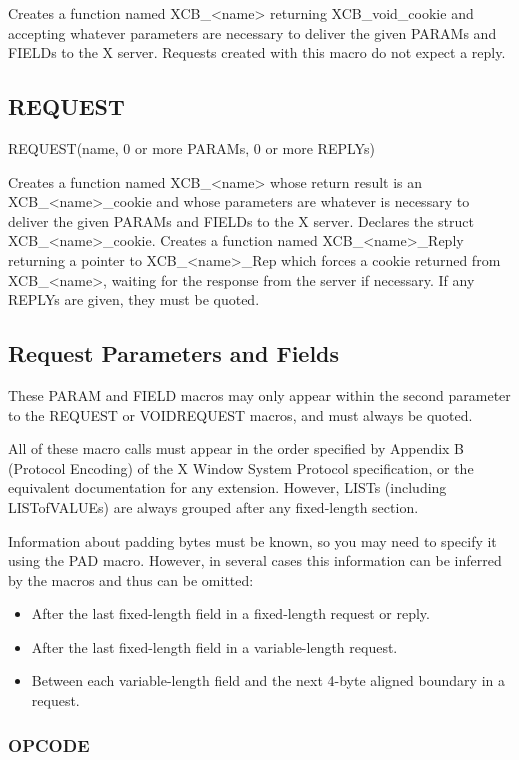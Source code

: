 \documentclass{article}
\begin{document}
Creates a function named XCB\_<name> returning XCB\_void\_cookie and
accepting whatever parameters are necessary to deliver the given PARAMs
and FIELDs to the X server. Requests created with this macro do not
expect a reply.


\subsection{REQUEST}

REQUEST(name, 0 or more PARAMs, 0 or more REPLYs)

Creates a function named XCB\_<name> whose return result is
an XCB\_<name>\_cookie and whose parameters are whatever is
necessary to deliver the given PARAMs and FIELDs to the X
server. Declares the struct XCB\_<name>\_cookie.  Creates a
function named XCB\_<name>\_Reply returning a pointer to
XCB\_<name>\_Rep which forces a cookie returned from
XCB\_<name>, waiting for the response from the server if
necessary. If any REPLYs are given, they must be quoted.


\subsection{Request Parameters and Fields}

These PARAM and FIELD macros may only appear within the second
parameter to the REQUEST or VOIDREQUEST macros, and must always
be quoted.

All of these macro calls must appear in the order specified
by Appendix B (Protocol Encoding) of the X Window System Protocol
specification, or the equivalent documentation for any extension.
However, LISTs (including LISTofVALUEs) are always grouped after
any fixed-length section.

Information about padding bytes must be known, so you may need to
specify it using the PAD macro. However, in several cases this
information can be inferred by the macros and thus can be omitted:
  \begin{itemize}
  \item After the last fixed-length field in a fixed-length request or reply.
  \item After the last fixed-length field in a variable-length request.
  \item Between each variable-length field and the next 4-byte aligned boundary in a request.
  \end{itemize}


\subsubsection{OPCODE}
\end{document}
